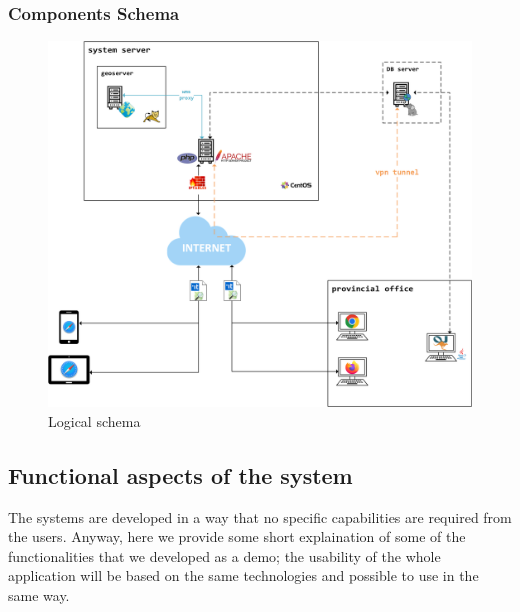 \subsubsection{Components Schema}
\begin{figure}[H]
    \includegraphics[width=\textwidth]{img/system}
    \caption{Logical schema}
    \label{LogicalSchema}
\end{figure}

\subsection{Functional aspects of the system}
The systems are developed in a way that no specific capabilities are required from the users.
Anyway, here we provide some short explaination of some of the functionalities that we developed as a demo; the usability of the whole application will be based on the same technologies and possible to use in the same way. 
